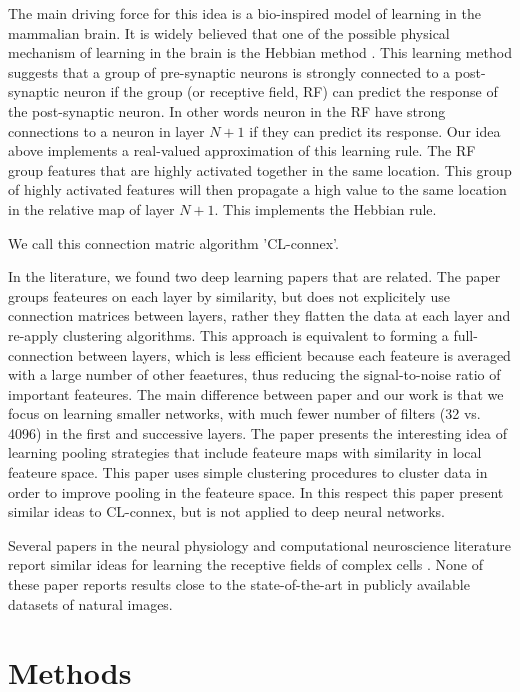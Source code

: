 \documentclass{article} %
\begin{document}
The main driving force for this idea is a bio-inspired model of learning in the mammalian brain. It is widely believed that one of the possible physical mechanism of learning in the brain is the Hebbian method \cite{masquelier2007learning}. This learning method suggests that a group of pre-synaptic neurons is strongly connected to a post-synaptic neuron if the group (or receptive field, RF) can predict the response of the post-synaptic neuron. In other words neuron in the RF have strong connections to a neuron in layer $N+1$ if they can predict its response. Our idea above implements a real-valued approximation of this learning rule. The RF group features that are highly activated together in the same location. This group of highly activated features will then propagate a high value to the same location in the relative map of layer $N+1$. This implements the Hebbian rule.

We call this connection matric algorithm 'CL-connex'.

In the literature, we found two deep learning papers that are related. 
The paper \cite{coates2012learning} groups feateures on each layer by similarity, but does not explicitely use connection matrices between layers, rather they flatten the data at each layer and re-apply clustering algorithms. This approach is equivalent to forming a full-connection between layers, which is less efficient because each feateure is averaged with a large number of other feaetures, thus reducing the signal-to-noise ratio of important feateures. The main difference between paper \cite{coates2012learning} and our work is that we focus on learning smaller networks, with much fewer number of filters (32 vs. 4096) in the first and successive layers. 
The paper \cite{boureau_2011} presents the interesting idea of learning pooling strategies that include feateure maps with similarity in local feateure space. This paper uses simple clustering procedures to cluster data in order to improve pooling in the feateure space. In this respect this paper present similar ideas to CL-connex, but is not applied to deep neural networks.

Several papers in the neural physiology and computational neuroscience literature report similar ideas for learning the receptive fields of complex cells \cite{masquelier2007learning,spratling2005learning,wiskott2002slow,wallis1997invariant}. None of these paper reports results close to the state-of-the-art in publicly available datasets of natural images.


\section{Methods}
\label{sec-methods}
\end{document}
